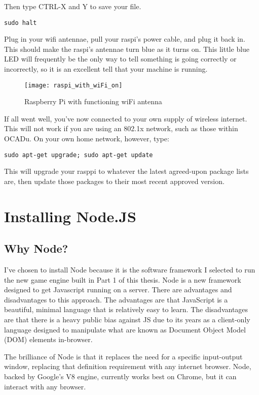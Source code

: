 Then type CTRL-X and Y to save your file.

\begin{lstlisting}
sudo halt
\end{lstlisting}

Plug in your wifi antennae, pull your raspi's power cable, and plug it back in. This should make the raspi's antennae turn blue as it turns on. This little blue LED will frequently be the only way to tell something is going correctly or incorrectly, so it is an excellent tell that your machine is running. 

\begin{figure}[h!]
  \caption{Raspberry Pi with functioning wiFi antenna}
  \centering
    \texttt{[image: raspi\_with\_wiFi\_on]}
\end{figure}

If all went well, you've now connected to your own supply of wireless internet. This will not work if you are using an 802.1x network, such as those within OCADu. On your own home network, however, type:

\begin{lstlisting}
sudo apt-get upgrade; sudo apt-get update
\end{lstlisting}

This will upgrade your rasppi to whatever the latest agreed-upon package lists are, then update those packages to their most recent approved version.

\section{Installing Node.JS}
\subsection{Why Node?}
I've chosen to install Node because it is the software framework I selected to run the new game engine built in Part 1 of this thesis. Node is a new framework designed to get Javascript running on a server. There are advantages and disadvantages to this approach. The advantages are that JavaScript is a beautiful, minimal language that is relatively easy to learn. The disadvantages are that there is a heavy public bias against JS due to its years as a client-only language designed to manipulate what are known as Document Object Model (DOM) elements in-browser.

The brilliance of Node is that it replaces the need for a specific input-output window, replacing that definition requirement with any internet browser. Node, backed by Google's V8 engine, currently works best on Chrome, but it can interact with any browser.

